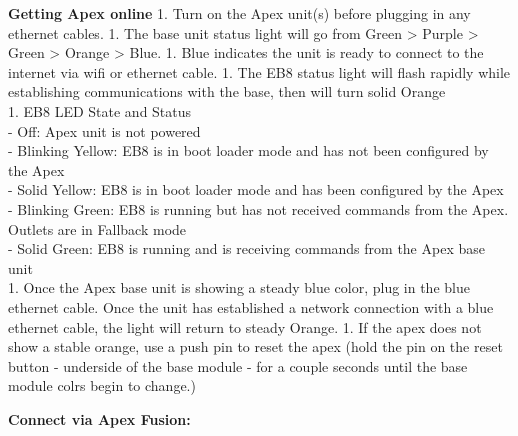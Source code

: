 \documentclass[
]{book}
\begin{document}
\textbf{Getting Apex online}
1. Turn on the Apex unit(s) before plugging in any ethernet cables.
1. The base unit status light will go from Green \textgreater{} Purple \textgreater{} Green \textgreater{} Orange \textgreater{} Blue.
1. Blue indicates the unit is ready to connect to the internet via wifi or ethernet cable.
1. The EB8 status light will flash rapidly while establishing communications with the base, then will turn solid Orange\\
1. EB8 LED State and Status\\
- Off: Apex unit is not powered\\
- Blinking Yellow: EB8 is in boot loader mode and has not been configured by the Apex\\
- Solid Yellow: EB8 is in boot loader mode and has been configured by the Apex\\
- Blinking Green: EB8 is running but has not received commands from the Apex. Outlets are in Fallback mode\\
- Solid Green: EB8 is running and is receiving commands from the Apex base unit\\
1. Once the Apex base unit is showing a steady blue color, plug in the blue ethernet cable. Once the unit has established a network connection with a blue ethernet cable, the light will return to steady Orange.
1. If the apex does not show a stable orange, use a push pin to reset the apex (hold the pin on the reset button - underside of the base module - for a couple seconds until the base module colrs begin to change.)

\textbf{Connect via Apex Fusion:}
\end{document}
